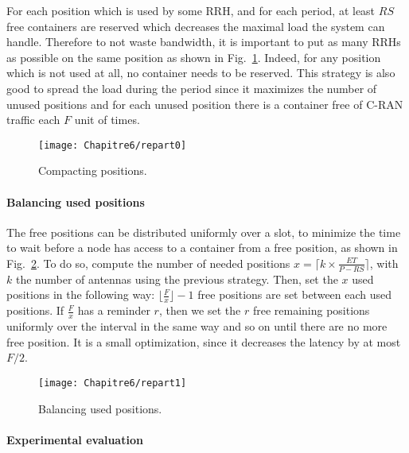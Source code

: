 For each position which is used by some RRH, and for each period, at least $RS$ free containers are reserved which decreases the maximal load the system can handle. Therefore to not waste bandwidth, it is important to put as many RRHs as possible on the same position as shown in Fig.~\ref{fig:packing}. Indeed, for any position which is not used at all, no container needs to be reserved. This strategy is also good to spread the load during the period since it maximizes the number of unused positions and for each unused position there is a container free of C-RAN traffic each $F$ unit of times. 
\begin{figure}[h!]
\begin{center}   

      \texttt{[image: Chapitre6/repart0]}
     \caption{Compacting positions.}\label{fig:packing}
     
\end{center}
  \end{figure}
      
\paragraph{Balancing used positions}

The free positions can be distributed uniformly over a slot, to minimize the time to wait before a node has access to a container from a free position, as shown in Fig.~\ref{fig:slotbal}. To do so, compute the number of needed positions $x = \lceil k\times \frac{ET}{P - RS}\rceil$, with $k$ the number of antennas using the previous strategy. Then, set the $x$ used positions in the following way: $\lfloor\frac{F}{x}\rfloor -1 $ free positions are set between each used positions. If $\frac{F}{x}$ has a reminder $r$, then we set the $r$ free remaining positions uniformly over the interval in the same way and so on until there are no more free position. It is a small optimization, since it decreases the latency by at most $F/2$.
    
\begin{figure}[h!]
\begin{center}   
      \texttt{[image: Chapitre6/repart1]}
     \caption{Balancing used positions.}\label{fig:slotbal}
\end{center}
  \end{figure}
   

  \paragraph{Experimental evaluation}

